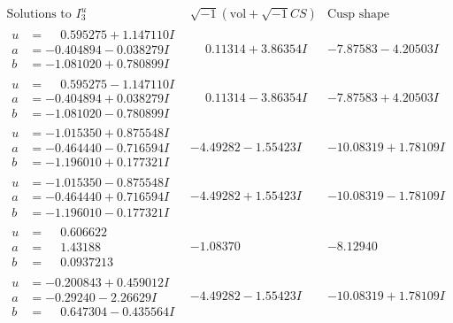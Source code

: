 \documentclass[1p]{elsarticle_modified}
\theoremstyle{definition}
\newcommand{\I}{\sqrt{-1}}
\begin{document}
$$\begin{array}{c|c|c}  
\text{Solutions to }I^u_{3}& \I (\text{vol} + \sqrt{-1}CS) & \text{Cusp shape}\\
 \hline 
\begin{aligned}
u &= \phantom{-}0.595275 + 1.147110 I \\
a &= -0.404894 - 0.038279 I \\
b &= -1.081020 + 0.780899 I\end{aligned}
 & \phantom{-}0.11314 + 3.86354 I & -7.87583 - 4.20503 I \\ \hline\begin{aligned}
u &= \phantom{-}0.595275 - 1.147110 I \\
a &= -0.404894 + 0.038279 I \\
b &= -1.081020 - 0.780899 I\end{aligned}
 & \phantom{-}0.11314 - 3.86354 I & -7.87583 + 4.20503 I \\ \hline\begin{aligned}
u &= -1.015350 + 0.875548 I \\
a &= -0.464440 - 0.716594 I \\
b &= -1.196010 + 0.177321 I\end{aligned}
 & -4.49282 - 1.55423 I & -10.08319 + 1.78109 I \\ \hline\begin{aligned}
u &= -1.015350 - 0.875548 I \\
a &= -0.464440 + 0.716594 I \\
b &= -1.196010 - 0.177321 I\end{aligned}
 & -4.49282 + 1.55423 I & -10.08319 - 1.78109 I \\ \hline\begin{aligned}
u &= \phantom{-}0.606622\phantom{ +0.000000I} \\
a &= \phantom{-}1.43188\phantom{ +0.000000I} \\
b &= \phantom{-}0.0937213\phantom{ +0.000000I}\end{aligned}
 & -1.08370\phantom{ +0.000000I} & -8.12940\phantom{ +0.000000I} \\ \hline\begin{aligned}
u &= -0.200843 + 0.459012 I \\
a &= -0.29240 - 2.26629 I \\
b &= \phantom{-}0.647304 - 0.435564 I\end{aligned}
 & -4.49282 - 1.55423 I & -10.08319 + 1.78109 I \\ \hline\begin{aligned}

\end{aligned}
\end{array}$$
\end{document}
